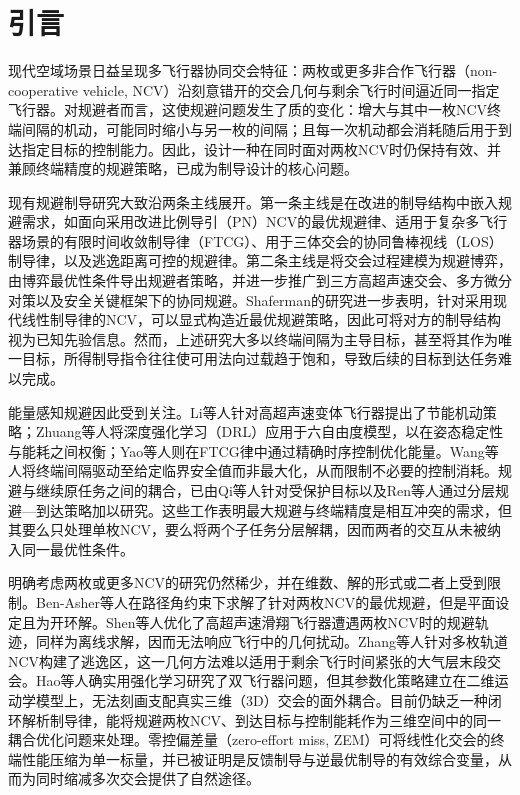\section{引言}
现代空域场景日益呈现多飞行器协同交会特征：两枚或更多非合作飞行器（non-cooperative vehicle, NCV）沿刻意错开的交会几何与剩余飞行时间逼近同一指定飞行器\cite{yan2020b,shalumov2019}。对规避者而言，这使规避问题发生了质的变化：增大与其中一枚NCV终端间隔的机动，可能同时缩小与另一枚的间隔；且每一次机动都会消耗随后用于到达指定目标的控制能力。因此，设计一种在同时面对两枚NCV时仍保持有效、并兼顾终端精度的规避策略，已成为制导设计的核心问题。

现有规避制导研究大致沿两条主线展开。第一条主线是在改进的制导结构中嵌入规避需求，如面向采用改进比例导引（PN）NCV的最优规避律\cite{feng2023}、适用于复杂多飞行器场景的有限时间收敛制导律（FTCG）\cite{ding2024}、用于三体交会的协同鲁棒视线（LOS）制导律\cite{luo2023}，以及逃逸距离可控的规避律\cite{yu2023}。第二条主线是将交会过程建模为规避博弈，由博弈最优性条件导出规避者策略\cite{turetsky2003}，并进一步推广到三方高超声速交会\cite{yan2020a}、多方微分对策\cite{liang2022}以及安全关键框架下的协同规避\cite{chen2024}。Shaferman的研究进一步表明，针对采用现代线性制导律的NCV，可以显式构造近最优规避策略\cite{shaferman2021}，因此可将对方的制导结构视为已知先验信息。然而，上述研究大多以终端间隔为主导目标，甚至将其作为唯一目标，所得制导指令往往使可用法向过载趋于饱和，导致后续的目标到达任务难以完成。

能量感知规避因此受到关注。Li等人针对高超声速变体飞行器提出了节能机动策略\cite{li2024cja}；Zhuang等人将深度强化学习（DRL）应用于六自由度模型，以在姿态稳定性与能耗之间权衡\cite{zhuang2024}；Yao等人则在FTCG律中通过精确时序控制优化能量\cite{yao2024}。Wang等人将终端间隔驱动至给定临界安全值而非最大化，从而限制不必要的控制消耗\cite{wang2024}。规避与继续原任务之间的耦合，已由Qi等人针对受保护目标\cite{qi2017}以及Ren等人通过分层规避—到达策略\cite{ren2025}加以研究。这些工作表明最大规避与终端精度是相互冲突的需求，但其要么只处理单枚NCV，要么将两个子任务分层解耦，因而两者的交互从未被纳入同一最优性条件。

明确考虑两枚或更多NCV的研究仍然稀少，并在维数、解的形式或二者上受到限制。Ben-Asher等人在路径角约束下求解了针对两枚NCV的最优规避，但是平面设定且为开环解\cite{benasher1988}。Shen等人优化了高超声速滑翔飞行器遭遇两枚NCV时的规避轨迹，同样为离线求解，因而无法响应飞行中的几何扰动\cite{shen2022}。Zhang等人针对多枚轨道NCV构建了逃逸区，这一几何方法难以适用于剩余飞行时间紧张的大气层末段交会\cite{zhang2023}。Hao等人确实用强化学习研究了双飞行器问题，但其参数化策略建立在二维运动学模型上，无法刻画支配真实三维（3D）交会的面外耦合\cite{hao2025}。目前仍缺乏一种闭环解析制导律，能将规避两枚NCV、到达目标与控制能耗作为三维空间中的同一耦合优化问题来处理。零控偏差量（zero-effort miss, ZEM）可将线性化交会的终端性能压缩为单一标量\cite{zarchan2019}，并已被证明是反馈制导\cite{guo2013}与逆最优制导\cite{ma2022}的有效综合变量，从而为同时缩减多次交会提供了自然途径。

